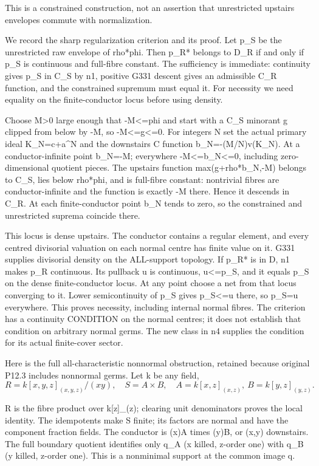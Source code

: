 \documentclass[11pt]{article}
\begin{document}
This is a constrained construction, not an assertion that unrestricted upstairs envelopes commute with normalization.

We record the sharp regularization criterion and its proof. Let p\_S be the unrestricted raw envelope of rho*phi. Then p\_R* belongs to D\_R if and only if p\_S is continuous and full-fibre constant. The sufficiency is immediate: continuity gives p\_S in C\_S by n1, positive G331 descent gives an admissible C\_R function, and the constrained supremum must equal it. For necessity we need equality on the finite-conductor locus before using density.

Choose M>0 large enough that -M<=phi and start with a C\_S minorant g clipped from below by -M, so -M<=g<=0. For integers N set the actual primary ideal K\_N=c+a\textasciicircum{}N and the downstairs C function b\_N=-(M/N)v(K\_N). At a conductor-infinite point b\_N=-M; everywhere -M<=b\_N<=0, including zero-dimensional quotient pieces. The upstairs function max(g+rho*b\_N,-M) belongs to C\_S, lies below rho*phi, and is full-fibre constant: nontrivial fibres are conductor-infinite and the function is exactly -M there. Hence it descends in C\_R. At each finite-conductor point b\_N tends to zero, so the constrained and unrestricted suprema coincide there.

This locus is dense upstairs. The conductor contains a regular element, and every centred divisorial valuation on each normal centre has finite value on it. G331 supplies divisorial density on the ALL-support topology. If p\_R* is in D, n1 makes p\_R continuous. Its pullback u is continuous, u<=p\_S, and it equals p\_S on the dense finite-conductor locus. At any point choose a net from that locus converging to it. Lower semicontinuity of p\_S gives p\_S<=u there, so p\_S=u everywhere. This proves necessity, including internal normal fibres. The criterion has a continuity CONDITION on the normal centres; it does not establish that condition on arbitrary normal germs. The new class in n4 supplies the condition for its actual finite-cover sector.

Here is the full all-characteristic nonnormal obstruction, retained because original P12.3 includes nonnormal germs. Let k be any field,
\[
R=k[x,y,z]_{(x,y,z)}/(xy),\quad
S=A\times B,
\quad A=k[x,z]_{(x,z)},\ B=k[y,z]_{(y,z)}.
\]

R is the fibre product over k[z]\_(z); clearing unit denominators proves the local identity. The idempotents make S finite; its factors are normal and have the component fraction fields. The conductor is (x)A times (y)B, or (x,y) downstairs. The full boundary quotient identifies only q\_A (x killed, z-order one) with q\_B (y killed, z-order one). This is a nonminimal support at the common image q.
\end{document}
